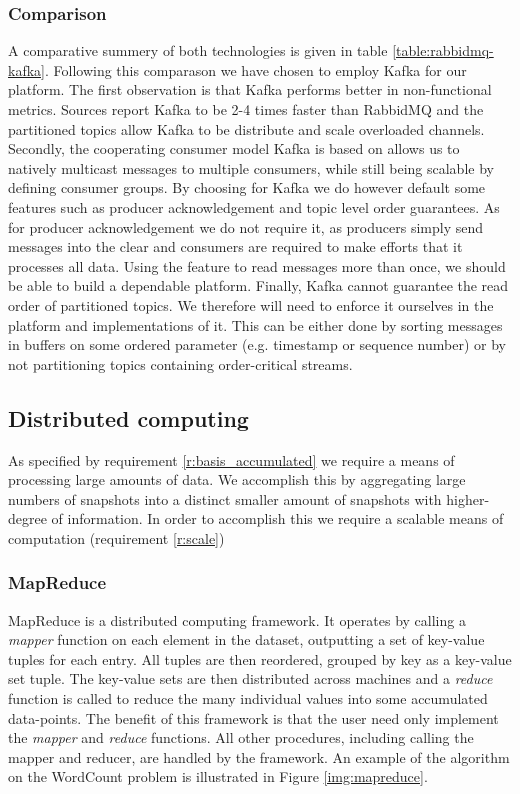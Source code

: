 \subsubsection*{Comparison}
A comparative summery of both technologies is given in table \ref{table:rabbidmq-kafka}. Following this comparason we have chosen to employ Kafka for our platform. The first observation is that Kafka performs better in non-functional metrics. Sources report Kafka to be 2-4 times faster than RabbidMQ\cite{speed_kafka} and the partitioned topics allow Kafka to be distribute and scale overloaded channels. Secondly, the cooperating consumer model Kafka is based on allows us to natively multicast messages to multiple consumers, while still being scalable by defining consumer groups. By choosing for Kafka we do however default some features such as producer acknowledgement and topic level order guarantees. As for producer acknowledgement we do not require it, as producers simply send messages into the clear and consumers are required to make efforts that it processes all data. Using the feature to read messages more than once, we should be able to build a dependable platform. Finally, Kafka cannot guarantee the read order of partitioned topics. We therefore will need to enforce it ourselves in the platform and implementations of it. This can be either done by sorting messages in buffers on some ordered parameter (e.g. timestamp or sequence number) or by not partitioning topics containing order-critical streams.


\subsection{Distributed computing}
As specified by requirement \ref{r:basis_accumulated} we require a means of processing large amounts of data. We accomplish this by aggregating large numbers of snapshots into a distinct smaller amount of snapshots with higher-degree of information. In order to accomplish this we require a scalable means of computation (requirement \ref{r:scale}) 
\subsubsection{MapReduce}
MapReduce\cite{web:mapreduce} is a distributed computing framework. It operates by calling a \emph{mapper} function on each element in the dataset, outputting a set of key-value tuples for each entry. All tuples are then reordered, grouped by key as a key-value set tuple. The key-value sets are then distributed across machines and a \emph{reduce} function is called to reduce the many individual values into some accumulated data-points. The benefit of this framework is that the user need only implement the \emph{mapper} and \emph{reduce} functions. All other procedures, including calling the mapper and reducer, are handled by the framework. An example of the algorithm on the WordCount\cite{search} problem is illustrated in Figure \ref{img:mapreduce}.

